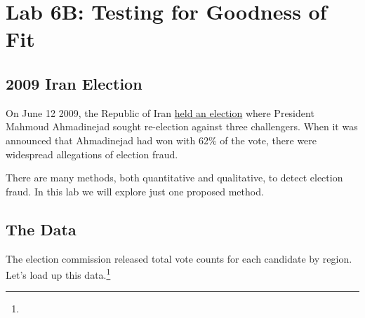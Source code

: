 \documentclass{article}\usepackage[]{graphicx}\usepackage[]{color}
\begin{document}


\section*{Lab 6B: Testing for Goodness of Fit}

\subsection*{2009 Iran Election}
On June 12 2009, the Republic of Iran \href{http://en.wikipedia.org/wiki/Iranian_presidential_election,_2009}{held an election} where President Mahmoud Ahmadinejad sought re-election against three challengers.  When it was announced that Ahmadinejad had won with 62\% of the vote, there were widespread allegations of election fraud.

There are many methods, both quantitative and qualitative, to detect election fraud.  In this lab we will explore just one proposed method.

\subsection*{The Data}
The election commission released total vote counts for each candidate by region.  Let's load up this data.\footnote{}
\end{document}
